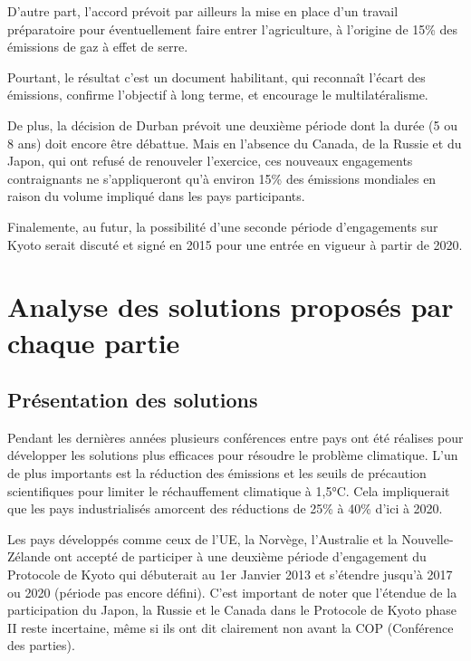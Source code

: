\documentclass[a4paper,10pt]{article}
\begin{document}
D’autre  part, l'accord  prévoit  par ailleurs  la  mise en  place d'un  travail
préparatoire pour éventuellement faire entrer l'agriculture, à l'origine de 15\%
des émissions de gaz à effet de serre. 


Pourtant, le  résultat c’est un  document habilitant, qui reconnaît  l'écart des
émissions, confirme l'objectif à long terme, et encourage le multilatéralisme.


De plus, la décision de Durban prévoit  une deuxième période dont la durée (5 ou
8 ans) doit encore  être débattue. Mais en l'absence du Canada,  de la Russie et
du  Japon, qui  ont refusé  de renouveler  l'exercice, ces  nouveaux engagements
contraignants  ne s'appliqueront qu'à  environ 15\%  des émissions  mondiales en
raison du volume impliqué dans les pays participants.


Finalemente, au  futur, la possibilité  d'une seconde période  d'engagements sur
Kyoto serait  discuté et signé en  2015 pour une  entrée en vigueur à  partir de
2020. 


\section{Analyse des solutions proposés par chaque partie}

\subsection{Présentation des solutions}

Pendant les dernières  années plusieurs conférences entre pays  ont été réalises
pour  développer  les  solutions   plus  efficaces  pour  résoudre  le  problème
climatique. L’un de plus importants est la réduction des émissions et les seuils
de  précaution   scientifiques  pour  limiter  le   réchauffement  climatique  à
1,5°C. Cela impliquerait que les  pays industrialisés amorcent des réductions de
25\% à 40\% d'ici à 2020. 


Les  pays  développés  comme  ceux  de  l’UE,  la  Norvège,  l'Australie  et  la
Nouvelle-Zélande ont  accepté de participer à une  deuxième période d'engagement
du Protocole  de Kyoto qui débuterait  au 1er Janvier 2013  et s'étendre jusqu'à
2017 ou 2020 (période pas encore défini). C’est important de noter que l'étendue
de la participation du Japon, la Russie  et le Canada dans le Protocole de Kyoto
phase  II reste incertaine,  même si  ils ont  dit clairement  non avant  la COP
(Conférence des parties).
\end{document}
